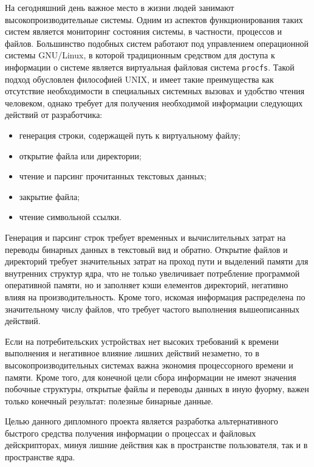 \label{sec:intro}
На сегодняшний день важное место в жизни людей занимают высокопроизводительные
системы. Одним из аспектов функционирования таких систем является мониторинг
состояния системы, в частности, процессов и файлов. Большинство подобных систем
работают под управлением операционной системы GNU/Linux, в которой традиционным
средством для доступа к информации о системе является виртуальная файловая
система \texttt{procfs}.
Такой подход обусловлен философией UNIX, и имеет такие преимущества как
отсутствие необходимости в специальных системных вызовах и удобство чтения
человеком, однако требует для получения необходимой информации следующих
действий от разработчика:

\begin{itemize}
\item генерация строки, содержащей путь к виртуальному файлу;
\item открытие файла или директории;
\item чтение и парсинг прочитанных текстовых данных;
\item закрытие файла;
\item чтение символьной ссылки.
\end{itemize}

Генерация и парсинг строк требует временных и вычислительных затрат на переводы
бинарных данных в текстовый вид и обратно. Открытие файлов и директорий требует
значительных затрат на проход пути и выделений памяти для внутренних структур
ядра, что не только увеличивает потребление программой оперативной памяти, но и
заполняет кэши елементов директорий, негативно влияя на производительность.
Кроме того, искомая информация распределена по значительному числу файлов, что
требует частого выполнения вышеописанных действий.

Если на потребительских устройствах нет высоких требований к времени выполнения
и негативное влияние лишних действий незаметно, то в высокопроизводительных
системах важна экономия процессорного времени и памяти. Кроме того, для конечной
цели сбора информации не имеют значения побочные структуры, открытые файлы и
переводы данных в иную фуорму, важен только конечный результат: полезные
бинарные данные.

Целью данного дипломного проекта является разработка альтернативного быстрого
средства получения информации о процессах и файловых дейскрипторах, минуя лишние
действия как в пространстве пользователя, так и в пространстве ядра.
